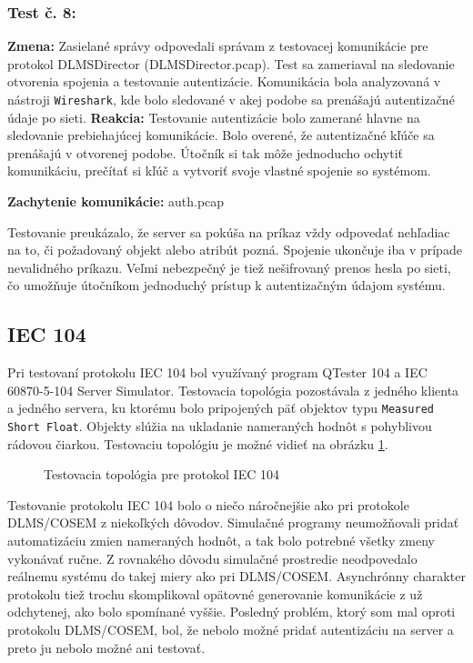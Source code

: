 \subsubsection{Test č. 8:}
\textbf{Zmena:} Zasielané správy odpovedali správam z testovacej komunikácie pre protokol DLMSDirector (DLMSDirector.pcap). Test sa zameriaval na sledovanie otvorenia spojenia a testovanie autentizácie. Komunikácia bola analyzovaná v nástroji {\tt Wireshark}, kde bolo sledované v akej podobe sa prenášajú autentizačné údaje po sieti. \newline
\textbf{Reakcia:} Testovanie autentizácie bolo zamerané hlavne na sledovanie prebiehajúcej komunikácie. Bolo overené, že autentizačné kľúče sa prenášajú v otvorenej podobe. Útočník si tak môže jednoducho ochytiť komunikáciu, prečítať si kľúč a vytvoriť svoje vlastné spojenie so systémom. \par
\noindent \textbf{Zachytenie komunikácie:} auth.pcap \newline \par
Testovanie preukázalo, že server sa pokúša na príkaz vždy odpovedať nehľadiac na to, či požadovaný objekt alebo atribút pozná. Spojenie ukončuje iba v prípade nevalidného príkazu. Veľmi nebezpečný je tiež nešifrovaný prenos hesla po sieti, čo umožňuje útočníkom jednoduchý prístup k autentizačným údajom systému.
\subsection{IEC 104}
\tab Pri testovaní protokolu IEC 104 bol využívaný program QTester 104 a IEC 60870-5-104 Server Simulator. Testovacia topológia pozostávala z jedného klienta a jedného servera, ku ktorému bolo pripojených päť objektov typu {\tt Measured Short Float}. Objekty slúžia na ukladanie nameraných hodnôt s pohyblivou rádovou čiarkou. Testovaciu topológiu je možné vidieť na obrázku \ref{iec-testing}.
\begin{figure}[h]
    \centering
    \caption{Testovacia topológia pre protokol IEC 104}
\label{iec-testing}
\end{figure}
Testovanie protokolu IEC 104 bolo o niečo náročnejšie ako pri protokole DLMS/COSEM z niekoľkých dôvodov. Simulačné programy neumožňovali pridať automatizáciu zmien nameraných hodnôt, a tak bolo potrebné všetky zmeny vykonávať ručne. Z rovnakého dôvodu simulačné prostredie neodpovedalo reálnemu systému do takej miery ako pri DLMS/COSEM. Asynchrónny charakter protokolu tiež trochu skomplikoval opätovné generovanie komunikácie z už odchytenej, ako bolo spomínané vyššie. Posledný problém, ktorý som mal oproti protokolu DLMS/COSEM, bol, že nebolo možné pridať autentizáciu na server a preto ju nebolo možné ani testovať.
